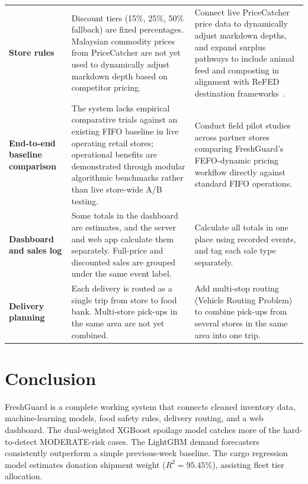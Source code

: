 \documentclass[12pt,a4paper]{article}
\renewcommand{\_}{\oldunderscore\allowbreak}
\begin{document}
\begin{table}[H]
{\begin{tabularx}{\textwidth}{@{} >{\bfseries}l >{\raggedright\arraybackslash}X >{\raggedright\arraybackslash}X @{}}
Store rules & Discount tiers (15\%, 25\%, 50\% fallback) are fixed percentages. Malaysian commodity prices from PriceCatcher are not yet used to dynamically adjust markdown depth based on competitor pricing. & Connect live PriceCatcher price data to dynamically adjust markdown depths, and expand surplus pathways to include animal feed and composting in alignment with ReFED destination frameworks~\cite{refed2026}. \\
\rowcolor{LightBg}
End-to-end baseline comparison & The system lacks empirical comparative trials against an existing FIFO baseline in live operating retail stores; operational benefits are demonstrated through modular algorithmic benchmarks rather than live store-wide A/B testing. & Conduct field pilot studies across partner stores comparing FreshGuard's FEFO-dynamic pricing workflow directly against standard FIFO operations. \\
Dashboard and sales log & Some totals in the dashboard are estimates, and the server and web app calculate them separately. Full-price and discounted sales are grouped under the same event label. & Calculate all totals in one place using recorded events, and tag each sale type separately. \\
\rowcolor{LightBg}
Delivery planning & Each delivery is routed as a single trip from store to food bank. Multi-store pick-ups in the same area are not yet combined. & Add multi-stop routing (Vehicle Routing Problem) to combine pick-ups from several stores in the same area into one trip. \\
\bottomrule
\end{tabularx}}
\end{table}

\section{Conclusion}

FreshGuard is a complete working system that connects cleaned inventory data, machine-learning models, food safety rules, delivery routing, and a web dashboard. The dual-weighted XGBoost spoilage model catches more of the hard-to-detect MODERATE-risk cases. The LightGBM demand forecasters consistently outperform a simple previous-week baseline. The cargo regression model estimates donation shipment weight ($R^2 = 95.45\%$), assisting fleet tier allocation.
\end{document}
